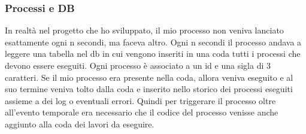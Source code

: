         \subsubsection{Processi e DB}
        In realtà nel progetto che ho sviluppato, il mio processo non veniva lanciato esattamente ogni n secondi, ma faceva altro.
        Ogni n secondi il processo andava a leggere una tabella nel db in cui vengono inseriti in una coda tutti i processi che devono essere eseguiti. Ogni processo è associato a un id e una sigla di 3 caratteri. Se il mio processo era presente nella coda, allora veniva eseguito e al suo termine veniva tolto dalla coda e inserito nello storico dei processi eseguiti assieme a dei log o eventuali errori.
        Quindi per triggerare il processo oltre all'evento temporale era necessario che il codice del processo venisse anche aggiunto alla coda dei lavori da eseguire.